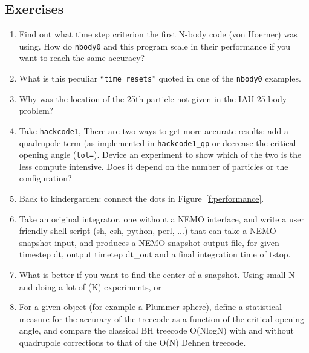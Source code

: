 \begin{itemize}
\begin{itemize}
\chapter                {Exercises}

\begin{enumerate}

\item 
Find out what time step criterion the first N-body code (von Hoerner)
was using. How do {\tt nbody0} and this program scale in their performance
if you want to reach the same accuracy?

\item
What is this peculiar ``{\tt time resets}'' quoted in one of the {\tt nbody0}
examples.

\item
Why was the location of the 25th particle not given in the IAU 25-body problem?

\item
Take {\tt hackcode1}, There are two ways to get more accurate results:
add a quadrupole term (as implemented in {\tt hackcode1\_qp} or decrease
the critical opening angle ({\tt tol=}). Device an experiment to show
which of the two is the less compute intensive. Does it depend on the 
number of particles or the configuration?

\item
Back to kindergarden: connect the dots in Figure~\ref{f:performance}.


\item
Take an original 
integrator, one without a NEMO interface, and write a user
friendly shell script (sh, csh, python, perl, ...) that can take a
NEMO snapshot input, and produces a NEMO snapshot output file, for
given timestep dt, output timetep dt\_out and a final integration
time of tstop.

\item
What is better if you want to find the center of a snapshot.
Using small N and doing a lot of (K) experiments, or 

\item
For a given object (for example a Plummer sphere), define a statistical
measure for the accurary of the treecode as a function of the critical
opening angle, and compare the classical BH treecode O(NlogN) with and
without quadrupole corrections to that of the O(N) Dehnen treecode.

\end{enumerate}



\end{itemize}
\end{itemize}
